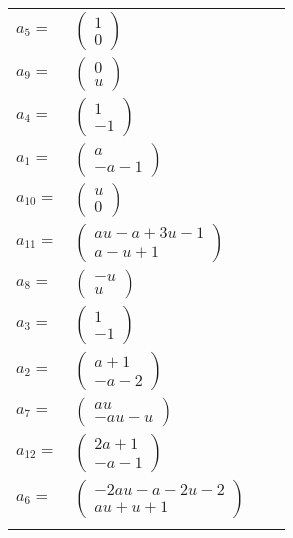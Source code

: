 \documentclass[1p]{elsarticle_modified}
\theoremstyle{definition}
\begin{document}
\begin{tabular}{m{7pt} m{180pt} m{7pt} m{180pt} }
\flushright $a_{5}=$&$\begin{pmatrix}1\\0\end{pmatrix}$ \\
\flushright $a_{9}=$&$\begin{pmatrix}0\\u\end{pmatrix}$ \\
\flushright $a_{4}=$&$\begin{pmatrix}1\\-1\end{pmatrix}$ \\
\flushright $a_{1}=$&$\begin{pmatrix}a\\- a-1\end{pmatrix}$ \\
\flushright $a_{10}=$&$\begin{pmatrix}u\\0\end{pmatrix}$ \\
\flushright $a_{11}=$&$\begin{pmatrix}a u- a+3 u-1\\a- u+1\end{pmatrix}$ \\
\flushright $a_{8}=$&$\begin{pmatrix}- u\\u\end{pmatrix}$ \\
\flushright $a_{3}=$&$\begin{pmatrix}1\\-1\end{pmatrix}$ \\
\flushright $a_{2}=$&$\begin{pmatrix}a+1\\- a-2\end{pmatrix}$ \\
\flushright $a_{7}=$&$\begin{pmatrix}a u\\- a u- u\end{pmatrix}$ \\
\flushright $a_{12}=$&$\begin{pmatrix}2 a+1\\- a-1\end{pmatrix}$ \\
\flushright $a_{6}=$&$\begin{pmatrix}-2 a u- a-2 u-2\\a u+u+1\end{pmatrix}$\\&\end{tabular}
\end{document}
